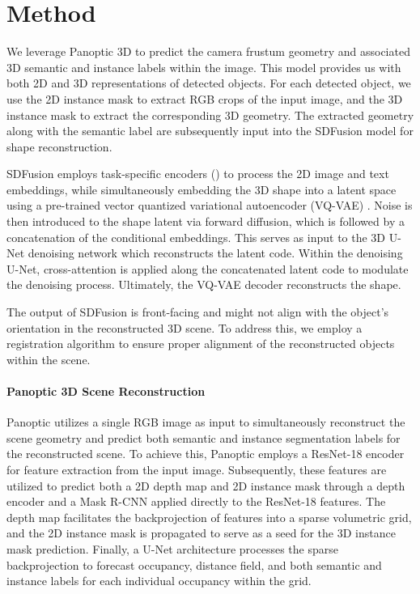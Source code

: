 \section{Method}
\label{sec:method}

We leverage Panoptic 3D \cite{dahnert2021panoptic} to predict the camera frustum geometry and associated 3D semantic and instance labels within the image. This model provides us with both 2D and 3D representations of detected objects.
For each detected object, we use the 2D instance mask to extract RGB crops of the input image, and the 3D instance mask to extract the corresponding 3D geometry.
The extracted geometry along with the semantic label are subsequently input into the SDFusion model for shape reconstruction.

SDFusion employs task-specific encoders (\citep{radford2021learning, devlin2018bert}) to process the 2D image and text embeddings, while simultaneously embedding the 3D shape into a latent space using a pre-trained vector quantized variational autoencoder (VQ-VAE) \citep{oord2017neural}. Noise is then introduced to the shape latent via forward diffusion, which is followed by a concatenation of the conditional embeddings. This serves as input to the 3D U-Net \citep{ronneberger2015u} denoising network which reconstructs the latent code. Within the denoising U-Net, cross-attention is applied along the concatenated latent code to modulate the denoising process. Ultimately, the VQ-VAE decoder reconstructs the shape.

The output of SDFusion is front-facing and might not align with the object's orientation in the reconstructed 3D scene. To address this, we employ a registration algorithm to ensure proper alignment of the reconstructed objects within the scene.

\paragraph{ Panoptic 3D Scene Reconstruction}
Panoptic \cite{dahnert2021panoptic} utilizes a single RGB image as input to simultaneously reconstruct the scene geometry and predict both semantic and instance segmentation labels for the reconstructed scene. To achieve this, Panoptic employs a ResNet-18 encoder for feature extraction from the input image. Subsequently, these features are utilized to predict both a 2D depth map and 2D instance mask through a depth encoder and a Mask R-CNN applied directly to the ResNet-18 features. The depth map facilitates the backprojection of features into a sparse volumetric grid, and the 2D instance mask is propagated to serve as a seed for the 3D instance mask prediction. Finally, a U-Net architecture processes the sparse backprojection to forecast occupancy, distance field, and both semantic and instance labels for each individual occupancy within the grid.

